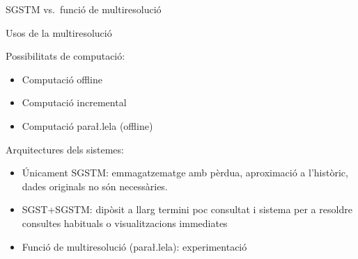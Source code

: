 \begin{frame}{SGSTM vs.\ funció de multiresolució}
\begin{center}
\end{center}


\end{frame}




\begin{frame}{Usos de la multiresolució}

Possibilitats de computació:

  \begin{itemize}
  \item Computació offline
  \item Computació incremental
  \item Computació para\l.lela (offline)
  \end{itemize}


Arquitectures dels sistemes:
  \begin{itemize}

  \item Únicament SGSTM: emmagatzematge amb pèrdua, aproximació a l'històric, dades originals no són necessàries.
  \item SGST+SGSTM: dipòsit a llarg termini poc consultat i sistema per a resoldre consultes habituals o visualitzacions immediates
  \item Funció de multiresolució (para\l.lela): experimentació 
  \end{itemize}


\end{frame}



